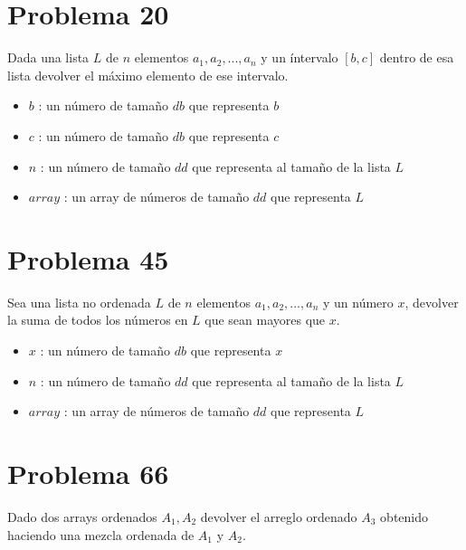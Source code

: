 \documentclass{report}
\begin{document}
\section*{Problema 20}

Dada una lista $L$ de $n$ elementos $a_1,a_2,...,a_n$ y un íntervalo $[b,c]$ dentro de esa lista devolver el máximo elemento de ese intervalo.

\begin{itemize}
    \item $b$ : un número de tamaño $db$ que representa $b$
    \item $c$ : un número de tamaño $db$ que representa $c$
    \item $n$ : un número de tamaño $dd$ que representa al tamaño de la lista $L$
    \item $array$ : un array de números de tamaño $dd$ que representa $L$
\end{itemize}


\begin{tcolorbox}
    
\end{tcolorbox}

\section*{Problema 45}

Sea una lista no ordenada $L$ de $n$ elementos $a_1,a_2,...,a_n$ y un número $x$, devolver la suma de todos los números en $L$ que sean mayores que $x$.
\begin{itemize}
    \item $x$ : un número de tamaño $db$ que representa $x$
    \item $n$ : un número de tamaño $dd$ que representa al tamaño de la lista $L$
    \item $array$ : un array de números de tamaño $dd$ que representa $L$
\end{itemize}

\begin{tcolorbox}
    
\end{tcolorbox}


\section*{Problema 66}

Dado dos arrays ordenados $A_1,A_2$ devolver el arreglo ordenado $A_3$ obtenido haciendo una mezcla ordenada de $A_1$ y $A_2$.
\end{document}
